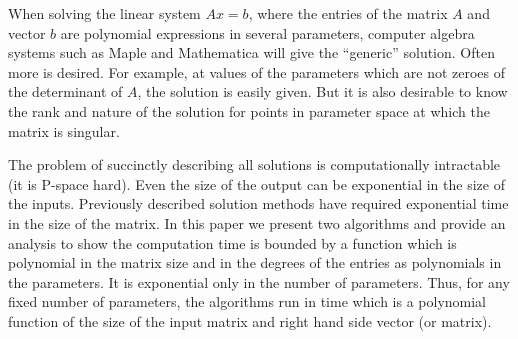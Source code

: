\medskip

When solving the linear system $Ax=b$, where the entries of the matrix
$A$ and vector $b$ are polynomial expressions in several parameters,
computer algebra systems such as Maple and Mathematica will give the
``generic'' solution.  Often more is desired.  For example, at values
of the parameters which are not zeroes of the determinant of $A$, the
solution is easily given. But it is also desirable to know the rank
and nature of the solution for points in parameter space at which the
matrix is singular.

The problem of succinctly describing all solutions is computationally
intractable (it is P-space hard).  Even the size of the output can be
exponential in the size of the inputs.  Previously described solution
methods have required exponential time in the size of the matrix.  In
this paper we present two algorithms and provide an analysis to show
the computation time is bounded by a function which is polynomial in
the matrix size and in the degrees of the entries as polynomials in
the parameters.  It is exponential only in the number of parameters.
Thus, for any fixed number of parameters, the algorithms run in time
which is a polynomial function of the size of the input matrix and
right hand side vector (or matrix).


